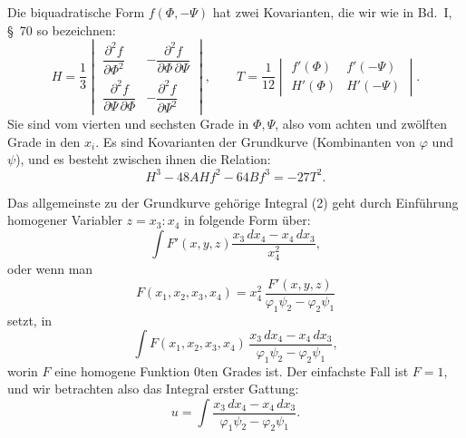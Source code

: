\documentclass[11pt]{article}
\begin{document}
Die biquadratische Form $f(\Phi,-\Psi)$ hat zwei Kovarianten, die wir wie in Bd.~I, \S~70 so bezeichnen:
\begin{equation}
H=\frac13
\begin{vmatrix}
\dfrac{\partial^2f}{\partial\Phi^2}&-\dfrac{\partial^2f}{\partial\Phi\,\partial\Psi}\\[0.5em]
\dfrac{\partial^2f}{\partial\Psi\,\partial\Phi}&-\dfrac{\partial^2f}{\partial\Psi^2}
\end{vmatrix},
\qquad
T=\frac1{12}
\begin{vmatrix}
f'(\Phi)&f'(-\Psi)\\
H'(\Phi)&H'(-\Psi)
\end{vmatrix}.
\tag{24}
\end{equation}
Sie sind vom vierten und sechsten Grade in $\Phi,\Psi$, also vom achten und zwölften Grade in den $x_i$. Es sind Kovarianten der Grundkurve (Kombinanten von $\varphi$ und $\psi$), und es besteht zwischen ihnen die Relation:
\begin{equation}
H^3-48AH f^2-64B f^3=-27T^2.
\tag{25}
\end{equation}

Das allgemeinste zu der Grundkurve gehörige Integral (2) geht durch Einführung homogener Variabler $z=x_3:x_4$ in folgende Form über:
\[
\int F'(x,y,z)\frac{x_3\,dx_4-x_4\,dx_3}{x_4^2},
\]
oder wenn man
\[
F(x_1,x_2,x_3,x_4)=x_4^2\,\frac{F'(x,y,z)}{\varphi_1\psi_2-\varphi_2\psi_1}
\]
setzt, in
\[
\int F(x_1,x_2,x_3,x_4)\,
\frac{x_3\,dx_4-x_4\,dx_3}{\varphi_1\psi_2-\varphi_2\psi_1},
\]
worin $F$ eine homogene Funktion $0$ten Grades ist. Der einfachste Fall ist $F=1$, und wir betrachten also das Integral erster Gattung:
\begin{equation}
u=\int \frac{x_3\,dx_4-x_4\,dx_3}{\varphi_1\psi_2-\varphi_2\psi_1}.
\tag{26}
\end{equation}
\end{document}
